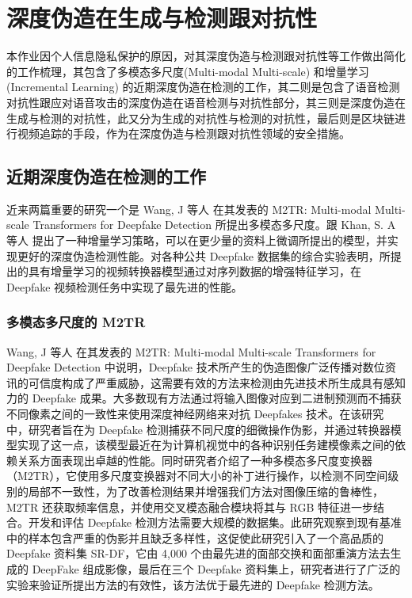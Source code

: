 \chapter{深度伪造在生成与检测跟对抗性}
\label{chap:1}

本作业因个人信息隐私保护的原因，对其深度伪造与检测跟对抗性等工作做出简化的工作梳理，其包含了多模态多尺度(Multi-modal Multi-scale) 和增量学习 (Incremental Learning) 的近期深度伪造在检测的工作，其二则是包含了语音检测对抗性跟应对语音攻击的深度伪造在语音检测与对抗性部分，其三则是深度伪造在生成与检测的对抗性，此又分为生成的对抗性与检测的对抗性，最后则是区块链进行视频追踪的手段，作为在深度伪造与检测跟对抗性领域的安全措施。

\section{近期深度伪造在检测的工作}

近来两篇重要的研究一个是 Wang, J 等人 \cite{wang2021m2tr} 在其发表的 M2TR: Multi-modal Multi-scale Transformers for Deepfake Detection 所提出多模态多尺度。跟 Khan, S. A 等人 \cite{khan2021video} 提出了一种增量学习策略，可以在更少量的资料上微调所提出的模型，并实现更好的深度伪造检测性能。对各种公共 Deepfake 数据集的综合实验表明，所提出的具有增量学习的视频转换器模型通过对序列数据的增强特征学习，在 Deepfake 视频检测任务中实现了最先进的性能。

\subsection{多模态多尺度的 M2TR}

Wang, J 等人 \cite{wang2021m2tr} 在其发表的 M2TR: Multi-modal Multi-scale Transformers for Deepfake Detection 中说明，Deepfake 技术所产生的伪造图像广泛传播对数位资讯的可信度构成了严重威胁，这需要有效的方法来检测由先进技术所生成具有感知力的 Deepfake 成果。大多数现有方法通过将输入图像对应到二进制预测而不捕获不同像素之间的一致性来使用深度神经网络来对抗 Deepfakes 技术。在该研究中，研究者旨在为 Deepfake 检测捕获不同尺度的细微操作伪影，并通过转换器模型实现了这一点，该模型最近在为计算机视觉中的各种识别任务建模像素之间的依赖关系方面表现出卓越的性能。同时研究者介绍了一种多模态多尺度变换器（M2TR），它使用多尺度变换器对不同大小的补丁进行操作，以检测不同空间级别的局部不一致性，为了改善检测结果并增强我们方法对图像压缩的鲁棒性，M2TR 还获取频率信息，并使用交叉模态融合模块将其与 RGB 特征进一步结合。开发和评估 Deepfake 检测方法需要大规模的数据集。此研究观察到现有基准中的样本包含严重的伪影并且缺乏多样性，这促使此研究引入了一个高品质的 Deepfake 资料集 SR-DF，它由 4,000 个由最先进的面部交换和面部重演方法去生成的 DeepFake 组成影像，最后在三个 Deepfake 资料集上，研究者进行了广泛的实验来验证所提出方法的有效性，该方法优于最先进的 Deepfake 检测方法。

